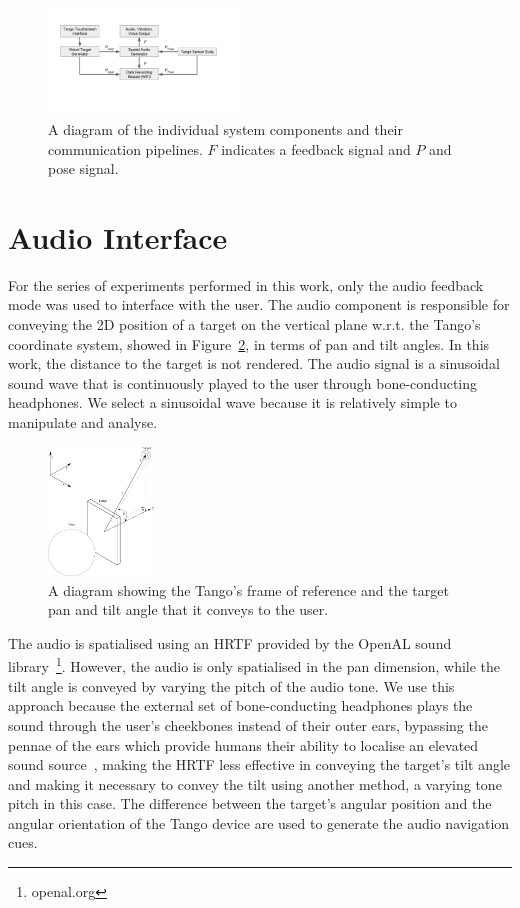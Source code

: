 \documentclass[format=sigconf, review=true, screen=true, anonymous=true]{acmart}
\begin{document}
\begin{figure}
  \centering
  \includegraphics[width=0.45\textwidth]{figures/pipeline.pdf}
  \caption{A diagram of the individual system components and their communication pipelines. $F$ indicates a feedback signal and $P$ and pose signal. }
  \label{fig:pipeline}
\end{figure}

\section{Audio Interface}
\label{sec:interface}

For the series of experiments performed in this work, only the audio feedback mode was used to interface with the user. The audio component is responsible for conveying the 2D position of a target on the vertical plane w.r.t. the Tango's coordinate system, showed in Figure~\ref{fig:cam-coords}, in terms of pan and tilt angles. In this work, the distance to the target is not rendered. The audio signal is a sinusoidal sound wave that is continuously played to the user through bone-conducting headphones. We select a sinusoidal wave because it is relatively simple to manipulate and analyse. 

\begin{figure}
  \centering
  \includegraphics[width=0.25\textwidth]{figures/camera_coordinate.pdf}
  \caption{A diagram showing the Tango's frame of reference and the target pan and tilt angle that it conveys to the user. }
  \label{fig:cam-coords}
\end{figure}

The audio is spatialised using an HRTF provided by the OpenAL sound library~\footnote{openal.org}. However, the audio is only spatialised in the pan dimension, while the tilt angle is conveyed by varying the pitch of the audio tone. We use this approach because the external set of bone-conducting headphones plays the sound through the user's cheekbones instead of their outer ears, bypassing the pennae of the ears which provide humans their ability to localise an elevated sound source~\cite{roffler1968factors, algazi2001elevation}, making the HRTF less effective in conveying the target's tilt angle and making it necessary to convey the tilt using another method, a varying tone pitch in this case. The difference between the target's angular position and the angular orientation of the Tango device are used to generate the audio navigation cues. 
\end{document}
